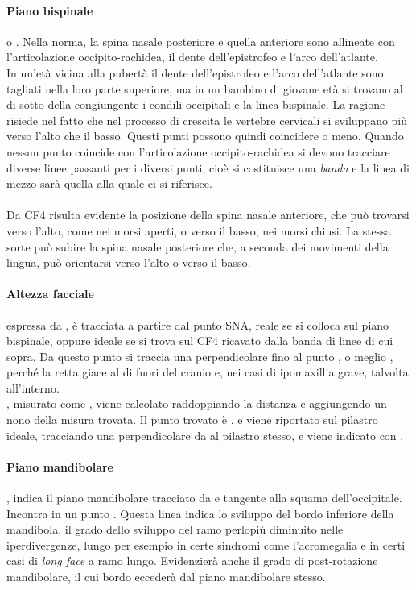 \paragraph{Piano bispinale} o . Nella norma, la spina nasale posteriore e quella anteriore sono allineate con l'articolazione occipito-rachidea, il dente dell'epistrofeo e l'arco dell'atlante.\\

In un'età vicina alla pubertà il dente dell'epistrofeo e l'arco dell'atlante sono tagliati nella loro parte superiore, ma in un bambino di giovane età si trovano al di sotto della congiungente i condili occipitali e la linea bispinale. La ragione risiede nel fatto che nel processo di crescita le vertebre cervicali si sviluppano più verso l'alto che il basso. Questi punti possono quindi coincidere o meno. Quando nessun punto coincide con l'articolazione occipito-rachidea si devono tracciare diverse linee passanti per i diversi punti, cioè si costituisce una \emph{banda} e la linea di mezzo sarà quella alla quale ci si riferisce.\\
\\
Da CF4 risulta evidente la posizione della spina nasale anteriore, che può trovarsi verso l'alto, come nei morsi aperti, o verso il basso, nei morsi chiusi. La stessa sorte può subire la spina nasale posteriore che, a seconda dei movimenti della lingua, può orientarsi verso l'alto o verso il basso.

\paragraph{Altezza facciale} espressa da , è tracciata a partire dal punto SNA, reale se si colloca sul piano bispinale, oppure ideale se si trova sul CF4 ricavato dalla banda di linee di cui sopra. Da questo punto si traccia una perpendicolare fino al punto , o meglio , perché la retta giace al di fuori del cranio e, nei casi di ipomaxillia grave, talvolta all'interno.\\

, misurato come , viene calcolato raddoppiando la distanza  e aggiungendo un nono della misura trovata. Il punto trovato è , e viene riportato sul pilastro ideale, tracciando una perpendicolare da  al pilastro stesso, e viene indicato con .\\

\paragraph{Piano mandibolare} , indica il piano mandibolare tracciato da  e tangente alla squama dell'occipitale. Incontra  in un punto . Questa linea indica lo sviluppo del bordo inferiore della mandibola, il grado dello sviluppo del ramo perlopiù diminuito nelle iperdivergenze, lungo per esempio in certe sindromi come l'acromegalia e in certi casi di \emph{long face} a ramo lungo. Evidenzierà anche il grado di post-rotazione mandibolare, il cui bordo eccederà dal piano mandibolare stesso.

